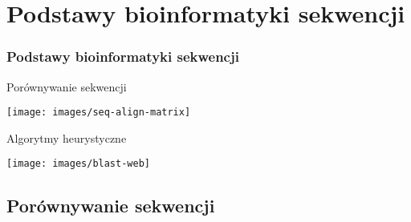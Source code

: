 \section{Podstawy bioinformatyki sekwencji}

\begin{frame}
\frametitle{Podstawy bioinformatyki sekwencji}

\small
\begin{minipage}[t]{.4\textwidth}\vspace{0pt}
 \centering Porównywanie
 sekwencji

 \vspace*{2em}\texttt{[image: images/seq-align-matrix]}
\end{minipage}%
\begin{minipage}[t]{.6\textwidth}\vspace{0pt}
\centering Algorytmy 
 heurystyczne

 \vspace*{2em}\texttt{[image: images/blast-web]}
\end{minipage}

\end{frame}

\subsection{Porównywanie sekwencji}

